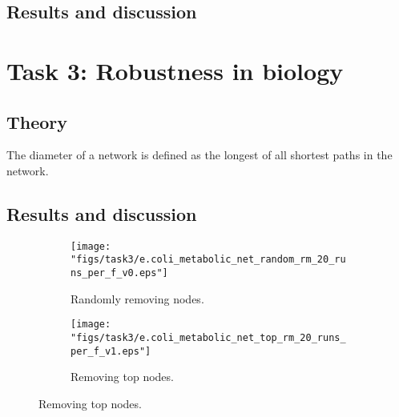 \documentclass{article}
\begin{document}
\subsection{Results and discussion}




\section{Task 3: Robustness in biology}
\subsection{Theory}
The diameter of a network is defined as the longest of all shortest paths in the network. 
\subsection{Results and discussion}

\begin{figure}[H]
	\centering
	\begin{subfigure}[b]{.49\textwidth}
		\centering
		\texttt{[image: "figs/task3/e.coli\_metabolic\_net\_random\_rm\_20\_runs\_per\_f\_v0.eps"]}
		\caption{Randomly removing nodes.}
		\label{fig:task3_rand}
	\end{subfigure}
	\begin{subfigure}[b]{.49\textwidth}
		\centering
		\texttt{[image: "figs/task3/e.coli\_metabolic\_net\_top\_rm\_20\_runs\_per\_f\_v1.eps"]}
		\caption{Removing top nodes.}
		\label{fig:task3_top}
	\end{subfigure}
\end{figure}
\end{document}
